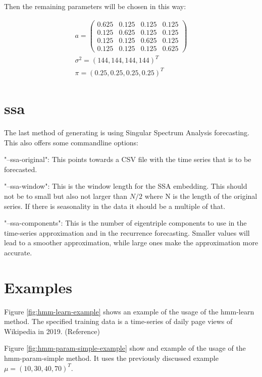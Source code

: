 Then the remaining parameters will be chosen in this way:

\begin{equation}
    \begin{split}
    a = 
    \begin{pmatrix}
        0.625 & 0.125 & 0.125 & 0.125 \\
        0.125 & 0.625 & 0.125 & 0.125 \\
        0.125 & 0.125 & 0.625 & 0.125 \\
        0.125 & 0.125 & 0.125 & 0.625
    \end{pmatrix} \\
    \sigma^2 = (144, 144, 144, 144)^T \\
    \pi = (0.25, 0.25, 0.25, 0.25)^T 
\end{split}
\end{equation}

\section{ssa}

The last method of generating is using Singular Spectrum Analysis forecasting. This also offers some commandline options: 

"--ssa-original": This points towards a CSV file with the time series that is to be forecasted. 

"--ssa-window": This is the window length for the SSA embedding. This should not be to small but also not larger than $N/2$ where N is the length of the original series. If there is seasonality in the data it should be a multiple of that. 

"--ssa-components": This is the number of eigentriple components to use in the time-series approximation and in the recurrence forecasting. Smaller values will lead to a smoother approximation, while large ones make the approximation more accurate. 

\section{Examples}

Figure \ref{fig:hmm-learn-example} shows an example of the usage of the hmm-learn method. The specified training data is a time-series of daily page views of Wikipedia in 2019. (Reference)

Figure \ref{fig:hmm-param-simple-example} show and example of the usage of the hmm-param-simple method. It uses the previously discussed example $\mu = (10, 30, 40, 70)^T$. 

